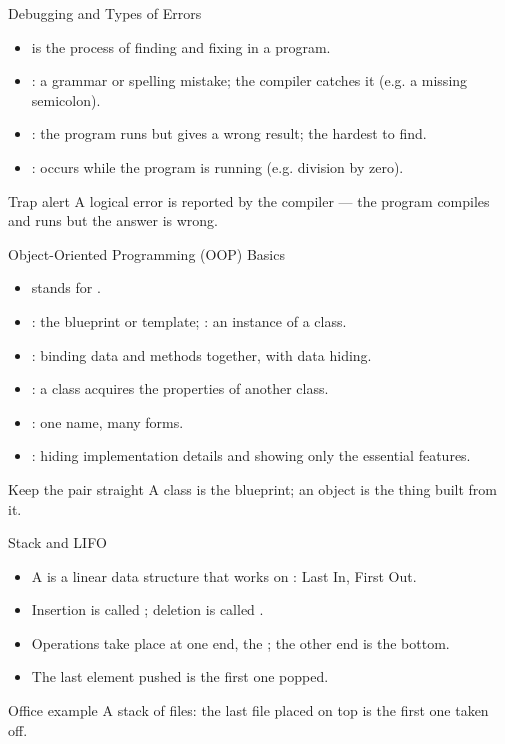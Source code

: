 \documentclass[aspectratio=169]{beamer}
\begin{document}
\begin{frame}{Debugging and Types of Errors}
  \begin{itemize}
    \item {} is the process of finding and fixing  in a program.
    \item {}: a grammar or spelling mistake; the compiler
      catches it (e.g. a missing semicolon).
    \item {}: the program runs but gives a wrong result;
      the hardest to find.
    \item {}: occurs while the program is running (e.g.
      division by zero).
  \end{itemize}
  \begin{alertblock}{Trap alert}
    A logical error is  reported by the compiler --- the program
    compiles and runs but the answer is wrong.
  \end{alertblock}
\end{frame}

\begin{frame}{Object-Oriented Programming (OOP) Basics}
  \begin{itemize}
    \item {} stands for .
    \item {}: the blueprint or template; : an instance
      of a class.
    \item {}: binding data and methods together, with data
      hiding.
    \item {}: a class acquires the properties of another
      class.
    \item {}: one name, many forms.
    \item {}: hiding implementation details and showing only
      the essential features.
  \end{itemize}
  \begin{block}{Keep the pair straight}
    A class is the blueprint; an object is the thing built from it.
  \end{block}
\end{frame}

\begin{frame}{Stack and LIFO}
  \begin{itemize}
    \item A  is a linear data structure that works on
      : Last In, First Out.
    \item Insertion is called ; deletion is called .
    \item Operations take place at one end, the ; the other end is
      the bottom.
    \item The last element pushed is the first one popped.
  \end{itemize}
  \begin{exampleblock}{Office example}
    A stack of files: the last file placed on top is the first one taken
    off.
  \end{exampleblock}
\end{frame}
\end{document}
